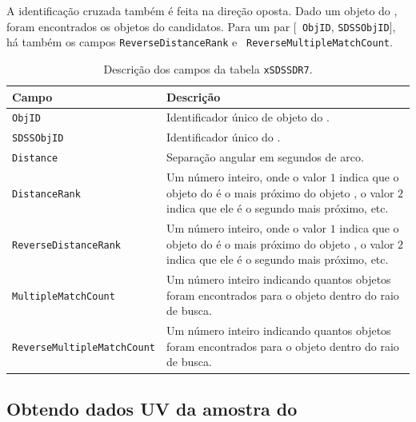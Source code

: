 A identificação cruzada também é feita na direção oposta. Dado um objeto do
\SDSS, foram encontrados os objetos do \galex candidatos. Para um par [{\tt
ObjID}, {\tt SDSSObjID}], há também os campos {\tt ReverseDistanceRank} e {\tt
ReverseMultipleMatchCount}.

\begin{table}
	\caption[Descrição dos campos da tabela {\tt xSDSSDR7}.]
	{Descrição dos campos da tabela {\tt xSDSSDR7}.}
	\begin{tabular}{l p{8cm}}
		Campo & Descrição\\
		\midrule
		{\tt ObjID} &
		Identificador único de objeto do \galex.
		\\
		{\tt SDSSObjID} &
		Identificador único do \SDSS.
		\\
		{\tt Distance} &
		Separação angular em segundos de arco.
		\\
		{\tt DistanceRank} &
		Um número inteiro, onde o valor $1$ indica que o objeto do \galex é o
		mais próximo do objeto \SDSS, o valor $2$ indica que ele é o segundo mais
		próximo, etc.
		\\
		{\tt ReverseDistanceRank} &
		Um número inteiro, onde o valor $1$ indica que o objeto do \SDSS é o mais
		próximo do objeto \galex, o valor $2$ indica que ele é o segundo mais
		próximo, etc.
		\\
		{\tt MultipleMatchCount} &
		Um número inteiro indicando quantos objetos \SDSS foram encontrados para o
		objeto \galex dentro do raio de busca.
		\\
		{\tt ReverseMultipleMatchCount} &
		Um número inteiro indicando quantos objetos \galex foram encontrados para o
		objeto \SDSS dentro do raio de busca.
		\\
	\end{tabular}
	\label{tab:CamposXSDSSDR7}
\end{table}

\subsection{Obtendo dados UV da amostra do \STARLIGHT}

